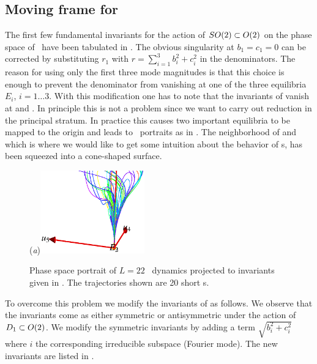 \subsection{Moving frame for \KSe}

The first few fundamental invariants for the action of $SO(2)\subset O(2)$ on the phase space
of \KSe\ have been tabulated in . The obvious singularity at $b_1=c_1=0$ can be
corrected by substituting $r_1$ with $r=\sum_{i=1}^3 b_i^2+c_i^2$ in the denominators. The reason
for using only the first three mode magnitudes is that this choice is enough to prevent the denominator from vanishing at one of the three equilibria $E_i$, $i=1\ldots3$. With this modification one has to note that the invariants of  vanish at  and . In principle this is not a problem since we want to carry out reduction in the principal stratum. In practice this causes two important equilibria to be mapped to the origin and leads to \statesp\ portraits as in . The neighborhood of  and  which is where we would like to get some intuition about the behavior of \rpo s, has been squeezed into a cone-shaped surface.

\begin{figure}[t]
\begin{center}
  (\textit{a})\includegraphics[width=0.4\textwidth]{../figs/ksSO2inv145eqbTo0.eps}
\end{center}
\caption[KSe SO(2) reduced phase space with modified invariants.]{ Phase space portrait of $L=22$ \KS\ dynamics projected to invariants given in . The trajectories shown are 20 short \rpo s.
   }
\label{fig:ksSO2eqbTo0}
\end{figure}

To overcome this problem we modify the invariants of   as follows. We observe that the invariants come as either symmetric or antisymmetric under the action of $D_{1}\subset O(2)$. We modify the symmetric invariants by adding a term $\sqrt{b_i^2+c_i^2}$ where $i$ the corresponding irreducible subspace  (Fourier mode). The new invariants are listed in .


